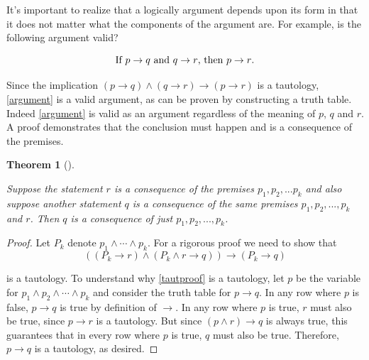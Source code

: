 \documentclass[
  letterpaper,
  10pt,
  reqno,
  twopage,
  openany]{book}
\theoremstyle{plain}
\theoremstyle{definition}
\theoremstyle{definition}
\theoremstyle{definition}
\theoremstyle{plain}
\theoremstyle{plain}
\newtheorem{theorem}{Theorem}[chapter]
\theoremstyle{remark}
\begin{document}
It's important to realize that a logically argument depends upon its
form in that it does not matter what the components of the argument are.
For example, is the following argument valid?

\begin{equation}
\label{argument}
\text{If $ p\rightarrow q$ and $q\rightarrow r$, then $p\rightarrow r$.}
\end{equation}

Since the implication
\((p\rightarrow q)\land (q\rightarrow r)\rightarrow (p\rightarrow r)\)
is a tautology, \eqref{argument} is a valid argument, as can be proven
by constructing a truth table. Indeed \eqref{argument} is valid as an
argument regardless of the meaning of \(p\), \(q\) and \(r\). A proof
demonstrates that the conclusion must happen and is a consequence of the
premises.

\leavevmode{}%
\begin{theorem}[]\label{thm-ProofTheorem}

Suppose the statement \(r\) is a consequence of the premises
\(p_1, p_2, ... p_k\) and also suppose another statement \(q\) is a
consequence of the same premises \(p_1, p_2, ..., p_k\) and \(r\). Then
\(q\) is a consequence of just \(p_1, p_2, ..., p_k\).

\end{theorem}

\begin{proof}

Let \(P_k\) denote \(p_1 \land \cdots \land p_k\). For a rigorous proof
we need to show that \begin{equation}
\label{tautproof}
\left( (P_k \rightarrow r) \land (P_k \land r \rightarrow q) \right)
\rightarrow \left( P_k \rightarrow q \right)
\end{equation}

is a tautology. To understand why \eqref{tautproof} is a tautology, let
\(p\) be the variable for \(p_1\land p_2\land \cdots \land p_k\) and
consider the truth table for \(p\rightarrow q\). In any row where \(p\)
is false, \(p\rightarrow q\) is true by definition of \(\rightarrow\).
In any row where \(p\) is true, \(r\) must also be true, since
\(p\rightarrow r\) is a tautology. But since \((p\land r)\rightarrow q\)
is always true, this guarantees that in every row where \(p\) is true,
\(q\) must also be true. Therefore, \(p\rightarrow q\) is a tautology,
as desired.

\end{proof}
\end{document}
